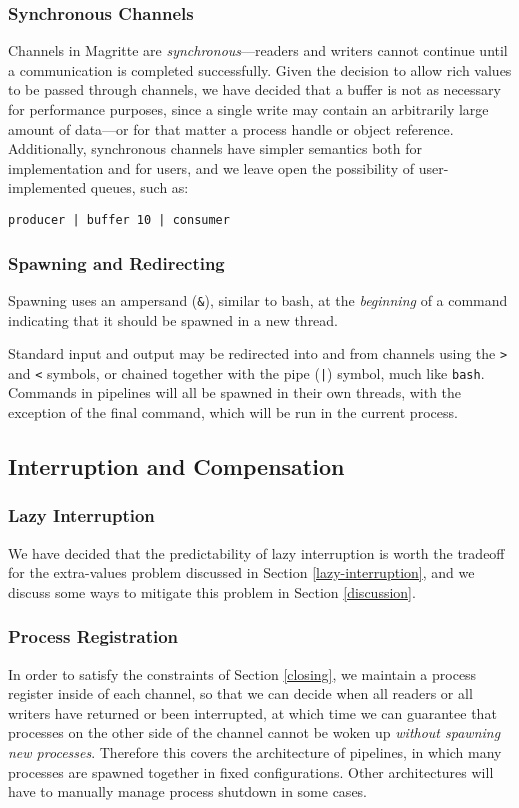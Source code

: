 \ifsigpro{ \documentclass[english,PRO]{ipsj} }
\begin{document}
\subsubsection{Synchronous Channels}\noindent
Channels in Magritte are \emph{synchronous}---readers and writers cannot continue until a communication is completed successfully. Given the decision to allow rich values to be passed through channels, we have decided that a buffer is not as necessary for performance purposes, since a single write may contain an arbitrarily large amount of data---or for that matter a process handle or object reference. Additionally, synchronous channels have simpler semantics both for implementation and for users, and we leave open the possibility of user-implemented queues, such as:
\begin{lstlisting}
producer | buffer 10 | consumer
\end{lstlisting}

\subsubsection{Spawning and Redirecting}\noindent
Spawning uses an ampersand (\verb/&/), similar to bash, at the \emph{beginning} of a command indicating that it should be spawned in a new thread.

Standard input and output may be redirected into and from channels using the \verb/>/ and \verb/</ symbols, or chained together with the pipe (\verb/|/) symbol, much like \verb/bash/. Commands in pipelines will all be spawned in their own threads, with the exception of the final command, which will be run in the current process.

\subsection{Interruption and Compensation}

\subsubsection{Lazy Interruption}\noindent
We have decided that the predictability of lazy interruption is worth the tradeoff for the extra-values problem discussed in Section \ref{lazy-interruption}, and we discuss some ways to mitigate this problem in Section \ref{discussion}.

\subsubsection{Process Registration}\label{process-registration}
In order to satisfy the constraints of Section \ref{closing}, we maintain a process register inside of each channel, so that we can decide when all readers or all writers have returned or been interrupted, at which time we can guarantee that processes on the other side of the channel cannot be woken up \emph{without spawning new processes}. Therefore this covers the architecture of pipelines, in which many processes are spawned together in fixed configurations. Other architectures will have to manually manage process shutdown in some cases.
\end{document}
